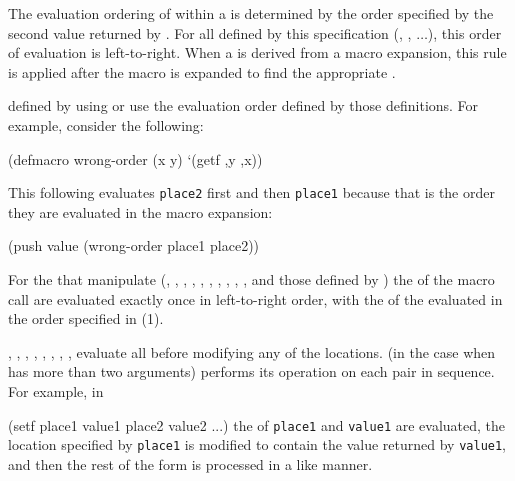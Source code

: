\beginlist
{}
The evaluation ordering of  within a 
is determined by the order specified by the second value returned by
. 
For all  defined by this specification
(\eg {}, , $\ldots$),
this order of evaluation is left-to-right.
When a 
is derived from a macro expansion, this rule is applied after the
macro is expanded to find the appropriate . 

 defined by using  or
use the evaluation order defined by those definitions.
For example, consider the following:

\code
 (defmacro wrong-order (x y) `(getf ,y ,x))
\endcode

This following  evaluates {\tt place2} first and
then {\tt place1} because that is the order they are evaluated in
the macro expansion:

\code
 (push value (wrong-order place1 place2))
\endcode

For the  
that manipulate  (,
, ,  , , 
, ,  , ,
, and those defined by )
the  of the macro call are evaluated exactly once
in left-to-right order, with the  of the 
evaluated in the order specified in (1).

, , , 
, , , , 
,  evaluate all  before modifying
any of the  locations.   
(in the case when  has more than two arguments) 
performs its operation on each pair in sequence. For example, in 

\code
 (setf place1 value1 place2 value2 ...)
\endcode
the  of {\tt place1} and {\tt value1} are evaluated, the location
specified by 
{\tt place1} is modified to contain the value returned by 
{\tt value1}, and
then the rest of the  form is processed in a like manner.


